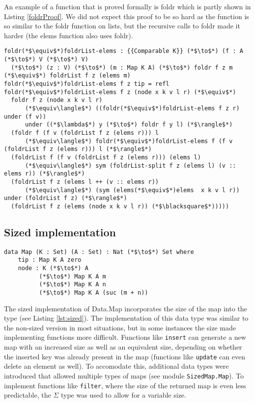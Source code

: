 \documentclass[a4paper,UKenglish,cleveref, autoref, thm-restate]{template/lipics-v2021}
\begin{document}
An example of a function that is proved formally is foldr which is partly shown in Listing \ref{foldrProof}. We did not expect this proof to be so hard as the function is so similar to the foldr function on lists, but the recursive calls to foldr made it harder (the elems function also uses foldr).

\begin{lstlisting}[label=foldrProof,caption=The following equality is proved foldr f z $\equiv$ foldr f z . elems]    
foldr(*$\equiv$*)foldrList-elems : {{Comparable K}} (*$\to$*) (f : A (*$\to$*) V (*$\to$*) V) 
  (*$\to$*) (z : V) (*$\to$*) (m : Map K A) (*$\to$*) foldr f z m (*$\equiv$*) foldrList f z (elems m)
foldr(*$\equiv$*)foldrList-elems f z tip = refl
foldr(*$\equiv$*)foldrList-elems f z (node x k v l r) (*$\equiv$*) 
  foldr f z (node x k v l r) 
      (*$\equiv\langle$*) ((foldr(*$\equiv$*)foldrList-elems f z r) under (f v)) 
      under ((*$\lambda$*) y (*$\to$*) foldr f y l) (*$\rangle$*)
  (foldr f (f v (foldrList f z (elems r))) l 
      (*$\equiv\langle$*) foldr(*$\equiv$*)foldrList-elems f (f v (foldrList f z (elems r))) l (*$\rangle$*)
  (foldrList f (f v (foldrList f z (elems r))) (elems l) 
      (*$\equiv\langle$*) sym (foldrList-split f z (elems l) (v :: elems r)) (*$\rangle$*)
  (foldrList f z (elems l ++ (v :: elems r)) 
      (*$\equiv\langle$*) (sym (elems(*$\equiv$*)elems  x k v l r)) under (foldrList f z) (*$\rangle$*)
  (foldrList f z (elems (node x k v l r)) (*$\blacksquare$*))))) 
\end{lstlisting}

\subsection{Sized implementation}

\begin{lstlisting}[label=lst:sized,caption=Sized map. The size of a tip is zero. The size of a node is one plus the sum of the sizes of its children.]
  data Map (K : Set) (A : Set) : Nat (*$\to$*) Set where
    tip : Map K A zero
    node : K (*$\to$*) A
          (*$\to$*) Map K A m
          (*$\to$*) Map K A n
          (*$\to$*) Map K A (suc (m + n))
\end{lstlisting}
The sized implementation of Data.Map incorporates the size of the map into the type (see Listing \ref{lst:sized}). The implementation of this data type was similar to the non-sized version in most situations, but in some instances the size made implementing functions more difficult. Functions like \texttt{insert} can generate a new map with an increased size as well as an equivalent size, depending on whether the inserted key was already present in the map (functions like \texttt{update} can even delete an element as well). To accomodate this, additional data types were introduced that allowed multiple types of maps (see module \texttt{SizedMap.Map}). To implement functions like \texttt{filter}, where the size of the returned map is even less predictable, the $\Sigma$ type was used to allow for a variable size.
\end{document}
